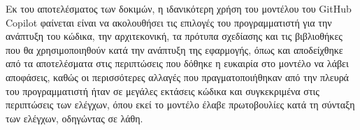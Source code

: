   Εκ του αποτελέσματος των δοκιμών, η ιδανικότερη χρήση του μοντέλου του
  \textlatin{GitHub Copilot} φαίνεται είναι να ακολουθήσει τις επιλογές
  του προγραμματιστή για την ανάπτυξη του κώδικα, την αρχιτεκονική, τα
  πρότυπα σχεδίασης και τις βιβλιοθήκες που θα χρησιμοποιηθούν κατά την
  ανάπτυξη της εφαρμογής, όπως και αποδείχθηκε από τα αποτελέσματα στις
  περιπτώσεις που δόθηκε η ευκαιρία στο μοντέλο να λάβει αποφάσεις, καθώς
  οι περισσότερες αλλαγές που πραγματοποιήθηκαν από την πλευρά του
  προγραμματιστή ήταν σε μεγάλες εκτάσεις κώδικα και συγκεκριμένα στις
  περιπτώσεις των ελέγχων, όπου εκεί το μοντέλο έλαβε πρωτοβουλίες κατά τη
  σύνταξη των ελέγχων, οδηγώντας σε λάθη.
